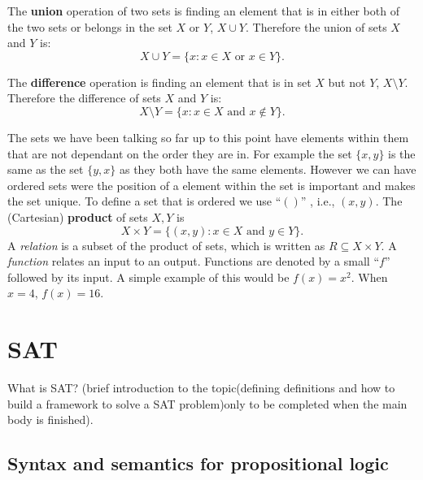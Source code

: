 \documentclass[11pt,a4paper]{report}
\begin{document}
The \textbf{union} operation of two sets is finding an element that is in either both of the two sets or belongs in the set $X$ or $Y$, $X \cup Y$. Therefore the union of sets $X$ and $Y$ is:
\begin{displaymath}
  X \cup Y = \{x : x \in X  \text{ or } x \in Y\}.
\end{displaymath}

The \textbf{difference} operation is finding an element that is in set $X$ but not $Y$, $X \setminus Y$. Therefore the difference of sets $X$ and $Y$ is:
\begin{displaymath}
  X \setminus Y = \{x : x \in X  \text{ and } x \notin Y\}.
\end{displaymath}

The sets we have been talking so far up to this point have elements within them that are not dependant on the order they are in. For example the set $\{x,y\}$ is the same as the set $\{y, x\}$ as they both have the same elements. However we can have ordered sets were the position of a element within the set is important and makes the set unique. To define a set that is ordered we use ``$()$'' , i.e., $(x,y)$. 
The (Cartesian) \textbf{product} of sets $X, Y$ is
\begin{displaymath}
  X \times Y = \{(x,y) : x \in X \text{ and } y \in Y\}.
\end{displaymath}
A \emph{relation} is a subset of the product of sets, which is written as $R \subseteq X \times Y$. A \emph{function} relates an input to an output. Functions are denoted by a small ``$f$'' followed by its input. A simple example of this would be $f(x) = x^2$. When $x=4$, $f(x) = 16$.



\section{SAT}
\label{sec:SAT}

What is SAT? (brief introduction to the topic(defining definitions and how to build a framework to solve a SAT problem)only to be completed when the main body is finished).




\subsection{Syntax and semantics for propositional logic}
\end{document}
